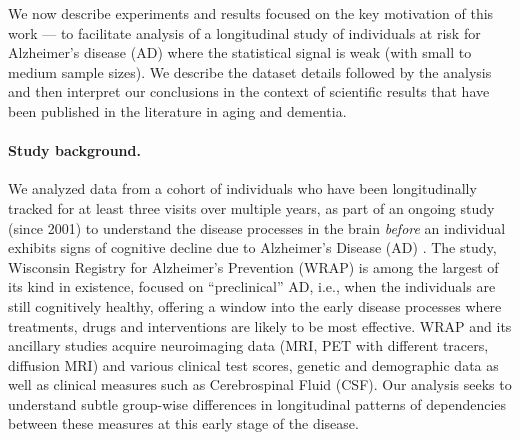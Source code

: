 We now describe experiments and results focused on the key motivation of this work --- to facilitate 
analysis of a longitudinal study of individuals at risk for Alzheimer's disease (AD) where the statistical 
signal is weak (with small to medium sample sizes). We describe the dataset details followed by the analysis and then interpret our conclusions 
in the context of scientific results that have been published in the literature in aging and dementia.

\paragraph{Study background.} We analyzed data from a 
cohort of individuals who have been longitudinally tracked for at least three visits over multiple years, as part of an ongoing study (since 2001)
to understand the disease processes in the brain {\em before} an individual exhibits signs of 
cognitive decline due to Alzheimer's Disease (AD) \citep{sager2005middle}. The study, Wisconsin Registry for 
Alzheimer's Prevention (WRAP)  
is among the largest of its kind in existence, focused on ``preclinical'' AD, i.e., when the 
individuals are still cognitively healthy, offering a window into the early disease processes 
where treatments, drugs and interventions are likely to be most effective. 
WRAP and its ancillary studies 
acquire neuroimaging data (MRI, PET with different tracers, diffusion MRI) and various clinical test scores, 
genetic and demographic data as well as clinical measures such as Cerebrospinal Fluid (CSF). Our analysis 
seeks to understand subtle group-wise differences in longitudinal patterns of dependencies between these measures at this early stage of the disease. 

